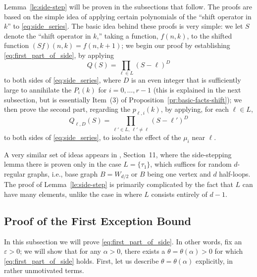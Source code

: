 \documentclass{memo-l}
\theoremstyle{plain}
\theoremstyle{definition}
\numberwithin{section}{chapter}
\numberwithin{equation}{chapter}
\theoremstyle{plain}
\theoremstyle{definition}
\begin{document}
Lemma~\ref{le:side-step} will be proven in the subsections that follow.  The
proofs are based on the simple idea of applying certain polynomials of the
``shift operator in \( k \)'' to \eqref{eq:side_series}.  The basic idea
behind these proofs is very simple: we let \( S \) denote the ``shift
operator in \( k \),'' taking a function, \( f(n,k) \), to the shifted
function \( (Sf)(n,k)=f(n,k+1) \); we begin our proof by establishing
\eqref{eq:first_part_of_side}, by applying \[ Q(S) = \prod_{\ell\in L}
(S-\ell)^D \] to both sides of \eqref{eq:side_series}, where \( D \) is an
even integer that is sufficiently large to annihilate the \( P_i(k) \) for
\( i=0,\ldots,r-1 \) (this is explained in the next subsection, but is
essentially Item~(3) of
Proposition~\ref{pr:basic-facts-shift}); we then prove
the second part, regarding the \( p_{\ell,i}(k) \), by applying, for each
\( \ell\in L \), \[ Q_{\ell,D}(S) = \prod_{\ell'\in L,\ \ell'\ne\ell}
(S-\ell')^D \] to both sides of \eqref{eq:side_series}, to isolate the
effect of the \( \mu_i \) near \( \ell \).  

A very similar set of ideas appears in \cite{friedman_alon}, Section~11,
where the side-stepping lemma there is proven only in the case \(
L=\{\tau_1\} \), which suffices for random \( d \)-regular graphs, i.e.,
base graph \( B=W_{d/2} \) or \( B \) being one vertex and \( d \)
half-loops.  The proof of Lemma~\ref{le:side-step} is primarily complicated
by the fact that \( L \) can have many elements, unlike the case in
\cite{friedman_alon} where $L$ consists entirely of $d-1$.

%
%
\subsection{Proof of the First Exception Bound}

In this subsection we will prove \eqref{eq:first_part_of_side}.  In other
words, fix an \( \varepsilon>0 \); we will show that for any \( \alpha>0
\), there exists a \( \theta=\theta(\alpha)>0 \) for which
\eqref{eq:first_part_of_side} holds. First, let us describe \(
\theta=\theta(\alpha) \) explicitly, in rather unmotivated terms.
\end{document}
